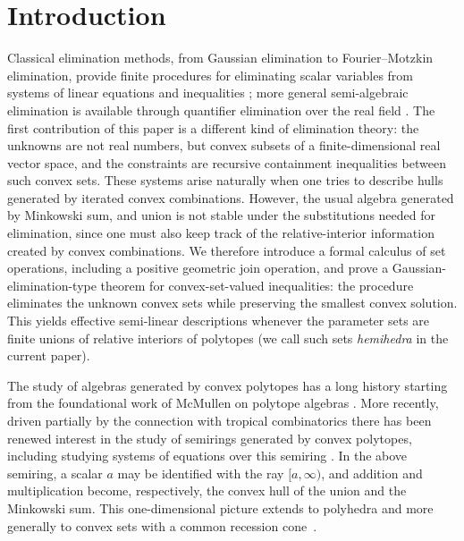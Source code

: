 \documentclass[10pt]{amsart}
\theoremstyle{plain}
\theoremstyle{definition}
\begin{document}
\tableofcontents

\section{Introduction}

Classical elimination methods, from Gaussian elimination to
Fourier--Motzkin elimination, provide finite procedures for eliminating
scalar variables from systems of linear equations and inequalities
\cite{Ziegler}; more general semi-algebraic elimination is available
through quantifier elimination over the real field \cite{BPRbook2}. The
first contribution of this paper is a different kind of elimination
theory: the unknowns are not real numbers, but convex subsets of a
finite-dimensional real vector space, and the constraints are recursive
containment inequalities between such convex sets. These systems arise
naturally when one tries to describe hulls generated by iterated convex
combinations. However, the usual algebra generated by Minkowski sum,
and union is not stable under the substitutions
needed for elimination, since one must also keep track of the
relative-interior information created by convex combinations. We
therefore introduce a formal calculus of set operations, including a
positive geometric join operation, and prove a
Gaussian-elimination-type theorem for convex-set-valued inequalities:
the procedure eliminates the unknown convex sets while preserving the
smallest convex solution. This yields effective semi-linear
descriptions whenever the parameter sets are finite unions of relative
interiors of polytopes (we call such sets \emph{hemihedra} in the current paper). 

\medskip
The study of algebras generated by convex polytopes has a long history starting from the foundational work of McMullen on polytope algebras \cite{McMullen89}. More recently, driven partially by the connection with tropical combinatorics \cite{Joswigbook} there has been renewed interest in the study of semirings generated by convex polytopes, including studying systems of equations over this semiring \cite{valnere2022basics, Manjunath2024}. 
In the above semiring, a scalar $a$ may be identified with the ray $[a,\infty)$, 
and addition and multiplication become, respectively, the convex hull of the union and the Minkowski sum. 
This one-dimensional picture extends to polyhedra and more generally to convex sets with a common recession cone~\cite{valnere2022basics}.
\end{document}

